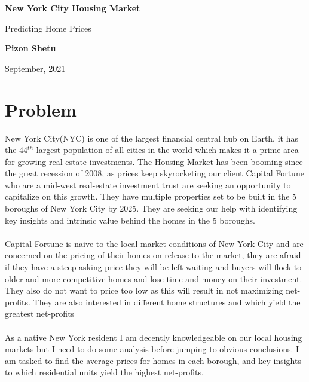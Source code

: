 \documentclass{article}
\begin{document}
\begin{titlepage}
   \begin{center}
       \vspace*{0.5cm}

       \textbf{New York City Housing Market}

       \vspace{0.5cm}
        Predicting Home Prices
            
       \vspace{0.5cm}

       \textbf{Pizon Shetu}
            
       \vspace{0.5cm}

       September, 2021
   \end{center}

\tableofcontents

\section{Problem}
    New York City(NYC) is one of the largest financial central hub on Earth, it has the 44$^{th}$ largest population of all cities in the world which makes it a prime area for growing real-estate investments. The Housing Market has been booming since the great recession of 2008, as prices keep skyrocketing our client Capital Fortune who are a mid-west real-estate investment trust are seeking an opportunity to capitalize on this growth. They have multiple properties set to be built in the 5 boroughs of New York City by 2025. They are seeking our help with identifying key insights and intrinsic value behind the homes in the 5 boroughs.  \\
    \\
    Capital Fortune is naive to the local market conditions of New York City and are concerned on the pricing of their homes on release to the market, they are afraid if they have a steep asking price they will be left waiting and buyers will flock to older and more competitive homes and lose time and money on their investment. They also do not want to price too low as this will result in not maximizing net-profits. They are also interested in different home structures and which yield the greatest net-profits \\
    \\
    As a native New York resident I am decently knowledgeable on our local housing markets but I need to do some analysis before jumping to obvious conclusions. I am tasked to find the average prices for homes in each borough, and key insights to which residential units yield the highest net-profits. \\


\end{titlepage}
\end{document}
